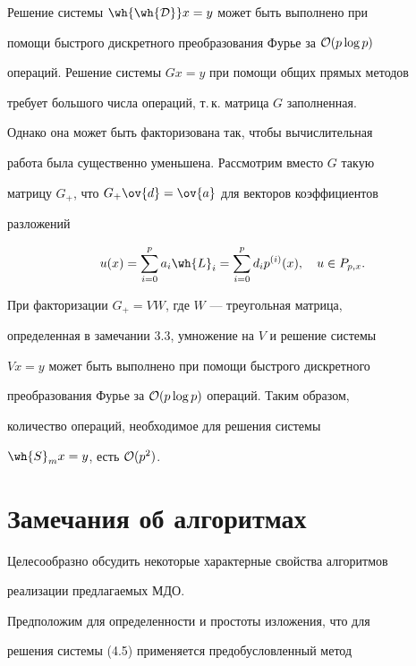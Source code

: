 \begin{notes}\label{rem6.2}


Решение системы $\wh{\wh{\cal D}} x = y$ может быть выполнено при 


помощи быстрого дискретного преобразования Фурье за ${\cal O}(p \log p)$ 


операций. Решение системы $G x=y$ при помощи общих прямых методов 


требует большого числа операций, т.\,к. матрица $G$ заполненная. 


Однако она может быть факторизована так, чтобы вычислительная 


работа была существенно уменьшена. Рассмотрим вместо $G$ такую 


матрицу $G_+$, что $G_+ \ov{d} = \ov{a}$ для векторов коэффициентов 


разложений


$$ 


u(x) = \sum^p_{i=0} a_i \wh{L}_i = \sum^p_{i=0} d_i p^{(i)}(x), 


\quad u\in P_{p,x}.


$$


При факторизации $G_+=VW$, где $W$ --- треугольная матрица, 


определенная в замечании 3.3, умножение на $V$ и решение системы 


$V x=y$ может быть выполнено при помощи быстрого дискретного 


преобразования Фурье за ${\cal O}(p \log p)$ операций. Таким образом, 


количество операций, необходимое для решения системы 


$\wh{S}_m x=y$, есть ${\cal O}(p^2)$.


\end{notes}





\section{Замечания об алгоритмах}





Целесообразно обсудить некоторые характерные свойства алгоритмов 


реализации предлагаемых МДО. 


Предположим для определенности и простоты изложения, что для 


решения системы (4.5) применяется предобусловленный метод 


